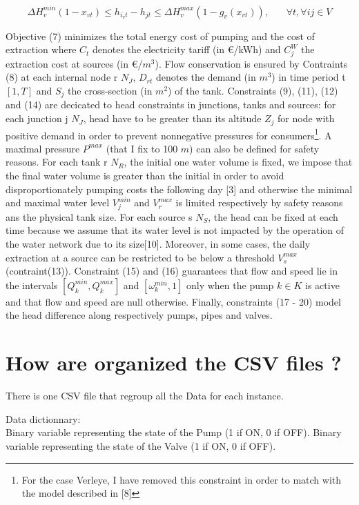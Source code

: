 \documentclass{article}
\begin{document}
\begin{equation}
\Delta H_v^{min}(1-x_{vt}) \leq h_{i_{v}t}-h_{jt} \leq \Delta H_v^{max}(1-g_v(x_{vt})), ~~~~~~~~ \forall t, \forall ij \in V
\end{equation}



\newpage

Objective (7) minimizes the total energy cost of pumping and the cost of extraction where $C_t$ denotes the electricity tariff (in \euro{}/kWh) and $C_j^W$ the extraction cost at sources (in \euro{}/$m^3$). Flow conservation is ensured by Contraints (8) at each internal node r \in $N_J$, $D_{rt}$ denotes the demand (in $m^3$) in time period t \in $[1,T]$ and $S_j$ the cross-section (in $m^2$) of the tank. Constraints (9), (11), (12) and (14) are decicated to head constraints in junctions, tanks and sources: for each junction j \in $N_J$, head have to be greater than its altitude $Z_j$ for node with positive demand in order to prevent nonnegative pressures for consumers\footnote{For the case Verleye, I have removed this constraint in order to match with the model described in [8]}. A maximal pressure $P^{max}$ (that I fix to 100 $m$) can also be defined for safety reasons. For each tank r \in $N_R$, the initial one water volume is fixed, we impose that the final water volume is greater than the initial in order to avoid disproportionately pumping costs the following day [3] and otherwise the minimal and maximal water level $V_j^{min}$ and $V_r^{max}$ is limited respectively by safety reasons ans the physical tank size. For each source s \in $N_S$, the head can be fixed at each time because we assume that its water level is not impacted by the operation of the water network due to its size[10]. Moreover, in some cases, the daily extraction at a source can be restricted to be below a threshold $V_s^{max}$ (contraint(13)). Constraint (15) and (16) guarantees that flow and speed lie in the intervals $[Q_k^{min},Q_k^{max}]$ and $[\omega_k^{min},1]$ only when the pump $k \in K$ is active and that flow and speed are null otherwise. Finally, constraints (17 - 20) model the head difference along respectively pumps, pipes and valves.


\section{How are organized the CSV files ?}

There is one CSV file that regroup all the Data for each instance.
















Data dictionnary:
\\
Binary variable representing the state of the Pump (1 if ON, 0 if OFF).
Binary variable representing the state of the Valve (1 if ON, 0 if OFF).
\end{document}
